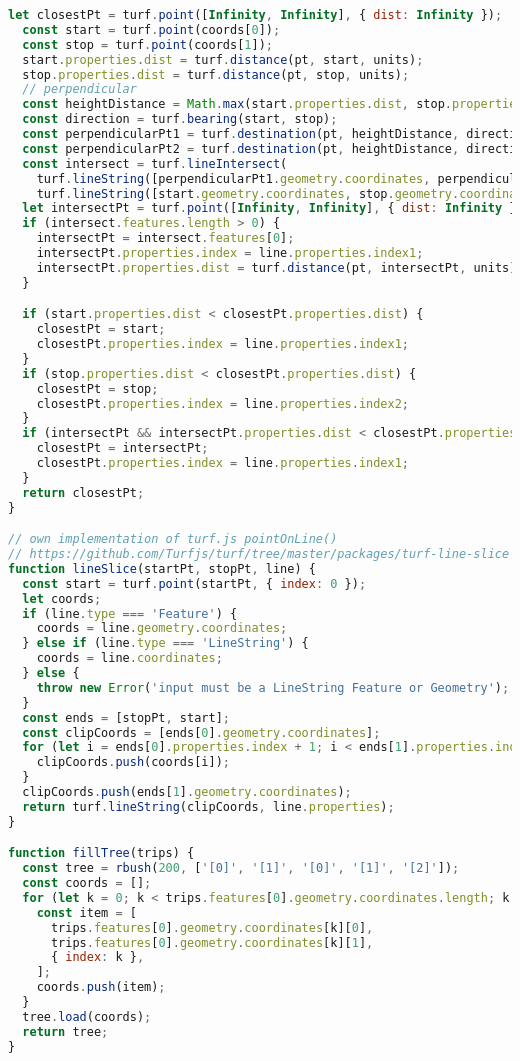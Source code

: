 \begin{newpage}
\begin{lstlisting}[captionpos=t, caption=Station Matching, label=lst:match_station, language=JavaScript]
  let closestPt = turf.point([Infinity, Infinity], { dist: Infinity });
  const start = turf.point(coords[0]);
  const stop = turf.point(coords[1]);
  start.properties.dist = turf.distance(pt, start, units);
  stop.properties.dist = turf.distance(pt, stop, units);
  // perpendicular
  const heightDistance = Math.max(start.properties.dist, stop.properties.dist);
  const direction = turf.bearing(start, stop);
  const perpendicularPt1 = turf.destination(pt, heightDistance, direction + 90, units);
  const perpendicularPt2 = turf.destination(pt, heightDistance, direction - 90, units);
  const intersect = turf.lineIntersect(
    turf.lineString([perpendicularPt1.geometry.coordinates, perpendicularPt2.geometry.coordinates]),
    turf.lineString([start.geometry.coordinates, stop.geometry.coordinates]));
  let intersectPt = turf.point([Infinity, Infinity], { dist: Infinity });
  if (intersect.features.length > 0) {
    intersectPt = intersect.features[0];
    intersectPt.properties.index = line.properties.index1;
    intersectPt.properties.dist = turf.distance(pt, intersectPt, units);
  }

  if (start.properties.dist < closestPt.properties.dist) {
    closestPt = start;
    closestPt.properties.index = line.properties.index1;
  }
  if (stop.properties.dist < closestPt.properties.dist) {
    closestPt = stop;
    closestPt.properties.index = line.properties.index2;
  }
  if (intersectPt && intersectPt.properties.dist < closestPt.properties.dist) {
    closestPt = intersectPt;
    closestPt.properties.index = line.properties.index1;
  }
  return closestPt;
}

// own implementation of turf.js pointOnLine()
// https://github.com/Turfjs/turf/tree/master/packages/turf-line-slice
function lineSlice(startPt, stopPt, line) {
  const start = turf.point(startPt, { index: 0 });
  let coords;
  if (line.type === 'Feature') {
    coords = line.geometry.coordinates;
  } else if (line.type === 'LineString') {
    coords = line.coordinates;
  } else {
    throw new Error('input must be a LineString Feature or Geometry');
  }
  const ends = [stopPt, start];
  const clipCoords = [ends[0].geometry.coordinates];
  for (let i = ends[0].properties.index + 1; i < ends[1].properties.index + 1; i += 1) {
    clipCoords.push(coords[i]);
  }
  clipCoords.push(ends[1].geometry.coordinates);
  return turf.lineString(clipCoords, line.properties);
}

function fillTree(trips) {
  const tree = rbush(200, ['[0]', '[1]', '[0]', '[1]', '[2]']);
  const coords = [];
  for (let k = 0; k < trips.features[0].geometry.coordinates.length; k += 1) {
    const item = [
      trips.features[0].geometry.coordinates[k][0],
      trips.features[0].geometry.coordinates[k][1],
      { index: k },
    ];
    coords.push(item);
  }
  tree.load(coords);
  return tree;
}


\end{lstlisting}
\end{newpage}

